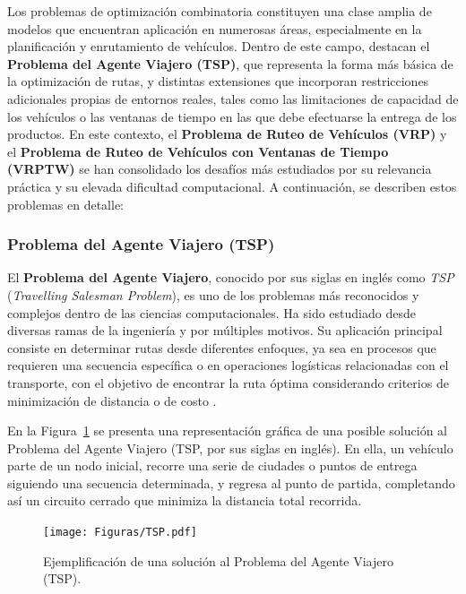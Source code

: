 \documentclass[12pt,titlepage,twoside,openright]{book}
\begin{document}
Los problemas de optimización combinatoria constituyen una clase amplia de modelos que encuentran aplicación en numerosas áreas, especialmente en la planificación y enrutamiento de vehículos. Dentro de este campo, destacan el \textbf{Problema del Agente Viajero (TSP)}, que representa la forma más básica de la optimización de rutas, y distintas extensiones que incorporan restricciones adicionales propias de entornos reales, tales como las limitaciones de capacidad de los vehículos o las ventanas de tiempo en las que debe efectuarse la entrega de los productos. En este contexto, el \textbf{Problema de Ruteo de Vehículos (VRP)} y el \textbf{Problema de Ruteo de Vehículos con Ventanas de Tiempo  (VRPTW)}  se han consolidado los desafíos más estudiados por su relevancia práctica y su elevada dificultad computacional. A continuación, se describen estos problemas en detalle:


\subsubsection{Problema del Agente Viajero (TSP)}
\label{subsec:problem_tsp}

El \textbf{Problema del Agente Viajero}, conocido por sus siglas en inglés como \textit{TSP} (\emph{Travelling Salesman Problem}), es uno de los problemas más reconocidos y complejos dentro de las ciencias computacionales. Ha sido estudiado desde diversas ramas de la ingeniería y por múltiples motivos. Su aplicación principal consiste en determinar rutas desde diferentes enfoques, ya sea en procesos que requieren una secuencia específica o en operaciones logísticas relacionadas con el transporte, con el objetivo de encontrar la ruta óptima considerando criterios de minimización de distancia o de costo \citep{lopez2014tabu}.

En la Figura~\ref{fig:tsp} se presenta una representación gráfica de una posible solución al Problema del Agente Viajero (TSP, por sus siglas en inglés). En ella, un vehículo parte de un nodo inicial, recorre una serie de ciudades o puntos de entrega siguiendo una secuencia determinada, y regresa al punto de partida, completando así un circuito cerrado que minimiza la distancia total recorrida.

\begin{figure}[H]
	\centering
	\texttt{[image: Figuras/TSP.pdf]}
	\caption{Ejemplificación de una solución al Problema del Agente Viajero (TSP).}
	\label{fig:tsp}
\end{figure}
\end{document}
